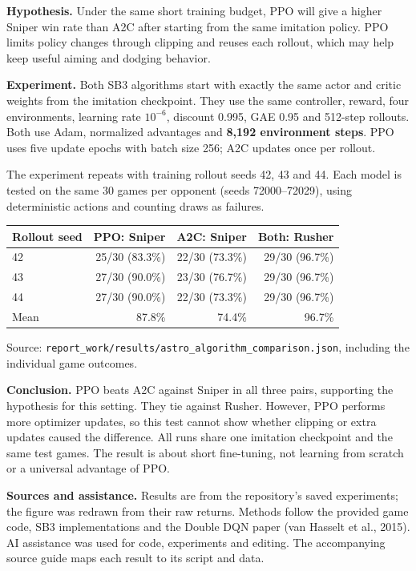 \documentclass[a4paper]{article}
\begin{document}
\begin{answer}
\textbf{Hypothesis.} Under the same short training budget, PPO will give a higher Sniper win rate than A2C after starting from the same imitation policy.
PPO limits policy changes through clipping and reuses each rollout, which may help keep useful aiming and dodging behavior.

\textbf{Experiment.} Both SB3 algorithms start with exactly the same actor and critic weights from the imitation checkpoint.
They use the same controller, reward, four environments, learning rate $10^{-6}$, discount 0.995, GAE 0.95 and 512-step rollouts.
Both use Adam, normalized advantages and \textbf{8,192 environment steps}.
PPO uses five update epochs with batch size 256; A2C updates once per rollout.

The experiment repeats with training rollout seeds 42, 43 and 44.
Each model is tested on the same 30 games per opponent (seeds 72000--72029), using deterministic actions and counting draws as failures.
\begin{center}
\begin{tabular}{lrrr}
\toprule
Rollout seed & PPO: Sniper & A2C: Sniper & Both: Rusher\\
\midrule
42 & 25/30 (83.3\%) & 22/30 (73.3\%) & 29/30 (96.7\%)\\
43 & 27/30 (90.0\%) & 23/30 (76.7\%) & 29/30 (96.7\%)\\
44 & 27/30 (90.0\%) & 22/30 (73.3\%) & 29/30 (96.7\%)\\
\midrule
Mean & 87.8\% & 74.4\% & 96.7\%\\
\bottomrule
\end{tabular}
\end{center}
Source: \texttt{report\_work/results/astro\_algorithm\_comparison.json}, including the individual game outcomes.

\textbf{Conclusion.} PPO beats A2C against Sniper in all three pairs, supporting the hypothesis for this setting. They tie against Rusher.
However, PPO performs more optimizer updates, so this test cannot show whether clipping or extra updates caused the difference.
All runs share one imitation checkpoint and the same test games. The result is about short fine-tuning, not learning from scratch or a universal advantage of PPO.
\end{answer}
\small
\textbf{Sources and assistance.}
Results are from the repository's saved experiments; the figure was redrawn from their raw returns.
Methods follow the provided game code, SB3 implementations and the Double DQN paper (van Hasselt et al., 2015).
AI assistance was used for code, experiments and editing. The accompanying source guide maps each result to its script and data.
\end{document}
